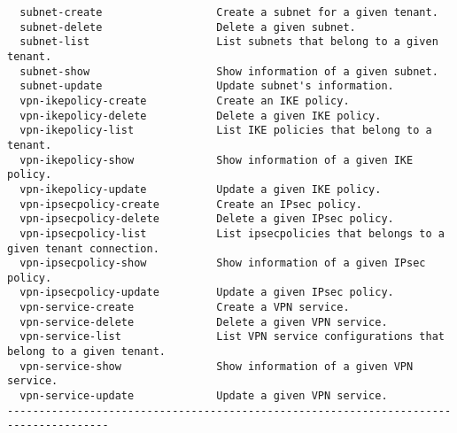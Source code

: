 \documentclass[a4paper,left=1.5cm,right=1.5cm,11pt]{article}
\begin{document}
\begin{lstlisting}
  subnet-create                  Create a subnet for a given tenant.
  subnet-delete                  Delete a given subnet.
  subnet-list                    List subnets that belong to a given tenant.
  subnet-show                    Show information of a given subnet.
  subnet-update                  Update subnet's information.
  vpn-ikepolicy-create           Create an IKE policy.
  vpn-ikepolicy-delete           Delete a given IKE policy.
  vpn-ikepolicy-list             List IKE policies that belong to a tenant.
  vpn-ikepolicy-show             Show information of a given IKE policy.
  vpn-ikepolicy-update           Update a given IKE policy.
  vpn-ipsecpolicy-create         Create an IPsec policy.
  vpn-ipsecpolicy-delete         Delete a given IPsec policy.
  vpn-ipsecpolicy-list           List ipsecpolicies that belongs to a given tenant connection.
  vpn-ipsecpolicy-show           Show information of a given IPsec policy.
  vpn-ipsecpolicy-update         Update a given IPsec policy.
  vpn-service-create             Create a VPN service.
  vpn-service-delete             Delete a given VPN service.
  vpn-service-list               List VPN service configurations that belong to a given tenant.
  vpn-service-show               Show information of a given VPN service.
  vpn-service-update             Update a given VPN service.
--------------------------------------------------------------------------------------
\end{lstlisting}
\end{document}
